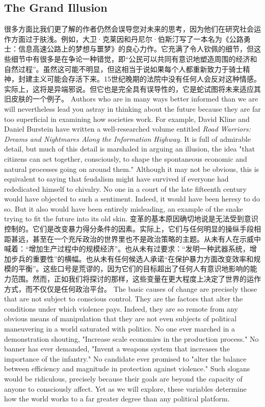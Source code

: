 \subsection{The Grand Illusion}
\begin{paracol}{2}  
很多方面比我们更了解的作者仍然会误导您对未来的思考，因为他们在研究社会运作方面过于肤浅。例如，大卫·克莱因和丹尼尔·伯斯汀写了一本名为《公路勇士：信息高速公路上的梦想与噩梦》的良心力作。它充满了令人钦佩的细节，但这些细节中有很多是在争论一种错觉，即“公民可以共同有意识地塑造周围的经济和自然过程”。虽然这可能不明显，但这相当于说如果每个人都重新致力于骑士精神，封建主义可能会存活下来。15世纪晚期的法院中没有任何人会反对这种情感。实际上，这将是异端邪说。但它也是完全具有误导性的，它是蛇试图将未来适应其旧皮肤的一个例子。
\switchcolumn
Authors who are in many ways better informed than we are will nevertheless lead you astray in thinking about the future because they are far too superficial in examining how societies work. For example, David Kline and Daniel Burstein have written a well-researched volume entitled \emph{Road Warriors: Dreams and Nightmares Along the Information Highway}. It is full of admirable detail, but much of this detail is marshaled in arguing an illusion, the idea "that citizens can act together, consciously, to shape the spontaneous economic and natural processes going on around them." Although it may not be obvious, this is equivalent to saying that feudalism might have survived if everyone had rededicated himself to chivalry. No one in a court of the late fifteenth century would have objected to such a sentiment. Indeed, it would have been heresy to do so. But it also would have been entirely misleading, an example of the snake trying to fit the future into its old skin.
\switchcolumn*
变革的基本原因确切地说是无法受到意识控制的。它们是改变暴力得分条件的因素。实际上，它们与任何明显的操纵手段相距甚远，甚至在一个充斥政治的世界里也不是政治策略的主题。从未有人在示威中喊着：“增加生产过程中的规模经济”。也从未有过要求：“发明一种武器系统，增加步兵的重要性”的横幅。也从未有任何候选人承诺“在保护暴力方面改变效率和规模的平衡”。这些口号是荒谬的，因为它们的目标超出了任何人有意识地影响的能力范围。然而，正如我们将探讨的那样，这些变量在更大程度上决定了世界的运作方式，而不仅仅是任何政治平台。
\switchcolumn
The basic causes of change are precisely those that are not subject to conscious control. They are the factors that alter the conditions under which violence pays. Indeed, they are so remote from any obvious means of manipulation that they are not even subjects of political maneuvering in a world saturated with politics. No one ever marched in a demonstration shouting, "Increase scale economies in the production process." No banner has ever demanded, "Invent a weapons system that increases the importance of the infantry." No candidate ever promised to "alter the balance between efficiency and magnitude in protection against violence." Such slogans would be ridiculous, precisely because their goals are beyond the capacity of anyone to consciously affect. Yet as we will explore, these variables determine how the world works to a far greater degree than any political platform.    

\end{paracol}
